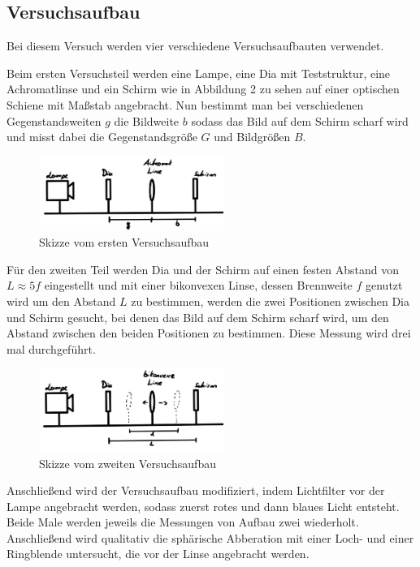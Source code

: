 \documentclass{article}
\begin{document}
\newpage

\subsection{Versuchsaufbau}

Bei diesem Versuch werden vier verschiedene Versuchsaufbauten verwendet.

Beim ersten Versuchsteil werden eine Lampe, eine Dia mit Teststruktur, eine Achromatlinse und ein Schirm wie in Abbildung 2 zu sehen auf einer optischen Schiene mit Maßstab angebracht. Nun bestimmt man bei verschiedenen Gegenstandsweiten $g$ die Bildweite $b$ sodass das Bild auf dem Schirm scharf wird und misst dabei die Gegenstandsgröße $G$ und Bildgrößen $B$.

\begin{figure} [h!]
    \centering
    \includegraphics[width=6cm]{graphics/1.jpg}
    \caption{Skizze vom ersten Versuchsaufbau}
\end{figure}

Für den zweiten Teil werden Dia und der Schirm auf einen festen Abstand von $L \approx 5f$ eingestellt und mit einer bikonvexen Linse, dessen Brennweite $f$ genutzt wird um den Abstand $L$ zu bestimmen, werden die zwei Positionen zwischen Dia und Schirm gesucht, bei denen das Bild auf dem Schirm scharf wird, um den Abstand zwischen den beiden Positionen zu bestimmen. Diese Messung wird drei mal durchgeführt.

\begin{figure} [h!]
    \centering
    \includegraphics[width=6cm]{graphics/2.jpg}
    \caption{Skizze vom zweiten Versuchsaufbau}
\end{figure}

\newpage

Anschließend wird der Versuchsaufbau modifiziert, indem Lichtfilter vor der Lampe angebracht werden, sodass zuerst rotes und dann blaues Licht entsteht. Beide Male werden jeweils die Messungen von Aufbau zwei wiederholt. Anschließend wird qualitativ die sphärische Abberation mit einer Loch- und einer Ringblende untersucht, die vor der Linse angebracht werden.
\end{document}
